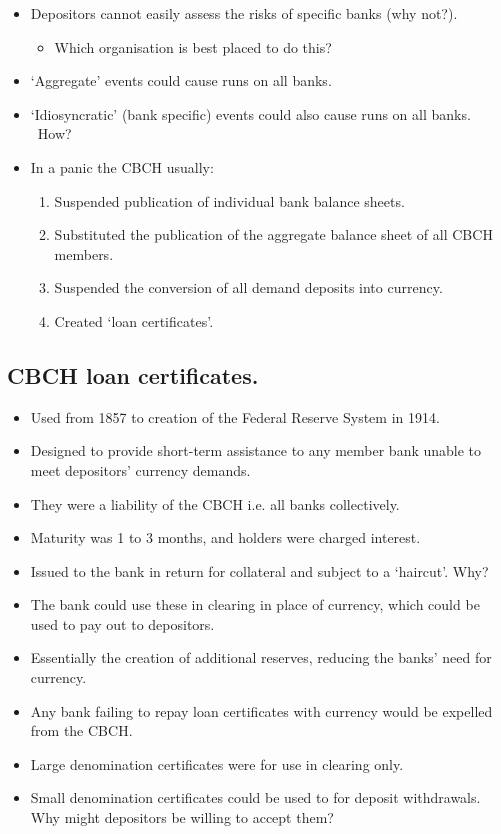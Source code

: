 \documentclass[20pt]{article}
\begin{document}
\begin{itemize}
    \item Depositors cannot easily assess the risks of specific banks (why not?). %
    \begin{itemize}
        \item Which organisation is best placed to do this? %
    \end{itemize}

    \item `Aggregate' events could cause runs on all banks.
    \item `Idiosyncratic' (bank specific) events could also cause runs on all banks. ~How? 

    \item In a panic the CBCH usually:
    \begin{enumerate}
        \item Suspended publication of individual bank balance sheets.
        \item Substituted the publication of the aggregate balance sheet of all CBCH members.
        \item Suspended the conversion of all demand deposits into currency.
        \item Created `loan certificates'.
    \end{enumerate}
\end{itemize}
\begin{screen}
\newpage
\end{screen}
\subsection{CBCH loan certificates.}
\begin{itemize}
    \item Used from 1857 to creation of the Federal Reserve System in 1914.
    \item Designed to provide short-term assistance to any member bank unable to meet depositors' currency demands.
    \item They were a liability of the CBCH i.e. all banks collectively.
    \item Maturity was 1 to 3 months, and holders were charged interest.
    \item Issued to the bank in return for collateral and subject to a `haircut'. Why?
    \item The bank could use these in clearing in place of currency, which could be used to pay out to depositors.
    \item Essentially the creation of additional reserves, reducing the banks' need for currency.
    \item Any bank failing to repay loan certificates with currency would be expelled from the CBCH.
    \item Large denomination certificates were for use in clearing only. 
    \item Small denomination certificates could be used to for deposit withdrawals.  Why might depositors be willing to accept them? 
\end{itemize}
\end{document}
